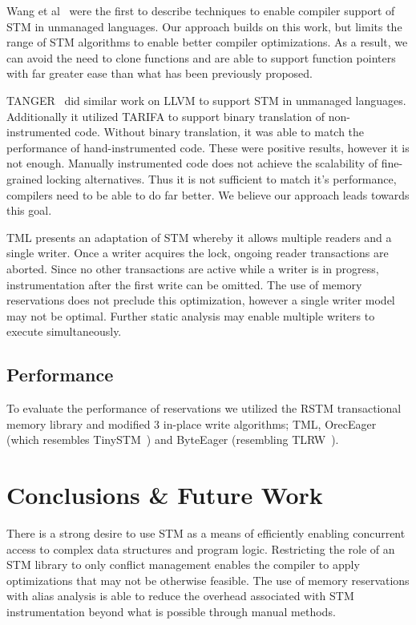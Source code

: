 \documentclass[preprint]{sigplanconf}
\begin{document}
Wang et al~\cite{4145103} were the first to describe techniques to enable compiler support of STM in unmanaged languages. Our approach builds on this work, but limits the range of STM algorithms to enable better compiler optimizations. As a result, we can avoid the need to clone functions and are able to support function pointers with far greater ease than what has been previously proposed.

TANGER~\cite{felber2007tanger} did similar work on LLVM to support STM in unmanaged languages. Additionally it utilized TARIFA to support binary translation of non-instrumented code. Without binary translation, it was able to match the performance of hand-instrumented code. These were positive results, however it is not enough. Manually instrumented code does not achieve the scalability of fine-grained locking alternatives. Thus it is not sufficient to match it's performance, compilers need to be able to do far better. We believe our approach leads towards this goal.

TML\cite{Dalessandro:2010:TML:1885276.1885279} presents an adaptation of STM whereby it allows multiple readers and a single writer. Once a writer acquires the lock, ongoing reader transactions are aborted. Since no other transactions are active while a writer is in progress, instrumentation after the first write can be omitted. The use of memory reservations does not preclude this optimization, however a single writer model may not be optimal. Further static analysis may enable multiple writers to execute simultaneously.

\subsection{Performance}

To evaluate the performance of reservations we utilized the RSTM transactional memory library and modified 3 in-place write algorithms; TML, OrecEager (which resembles TinySTM~\cite{Felber:2008:DPT:1345206.1345241}) and ByteEager (resembling TLRW~\cite{Dice:2010:TRR:1810479.1810531}).

\section{Conclusions \& Future Work}

There is a strong desire to use STM as a means of efficiently enabling concurrent access to complex data structures and program logic. Restricting the role of an STM library to only conflict management enables the compiler to apply optimizations that may not be otherwise feasible. The use of memory reservations with alias analysis is able to reduce the overhead associated with STM instrumentation beyond what is possible through manual methods.
\end{document}
